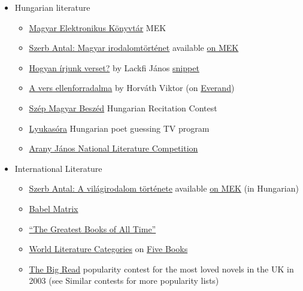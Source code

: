\documentclass{article}
\begin{document}
\begin{itemize}
    \item Hungarian literature
    \begin{itemize}
        \item \href{https://mek.oszk.hu/}{Magyar Elektronikus Könyvtár} MEK
        \item \href{https://moly.hu/konyvek/szerb-antal-magyar-irodalomtortenet}{Szerb Antal: Magyar irodalomtörténet} available \href{https://mek.oszk.hu/14800/14871/}{on MEK}
        \item \href{https://moly.hu/konyvek/lackfi-janos-hogyan-irjunk-verset}{Hogyan írjunk verset?} by Lackfi János \href{https://olvassbele.com/2021/02/05/lackfi-janos-hogyan-irjunk-verset-reszlet/}{snippet}
        \item \href{https://moly.hu/konyvek/horvath-viktor-a-vers-ellenforradalma}{A vers ellenforradalma} by Horváth Viktor (on \href{https://www.scribd.com/book/342092705/A-vers-ellenforradalma-A-versiras-es-versforditas-tanulasa-es-tanitasa}{Everand})
        \item \href{https://szepmagyarbeszed.hu/}{Szép Magyar Beszéd} Hungarian Recitation Contest
        \item \href{https://nava.hu/talalati-lista/?q=lyukas%C3%B3ra}{Lyukasóra} Hungarian poet guessing TV program
        \item \href{https://eotvos-tata.edu.hu/versenyek/AJIverseny/AJIverseny.htm}{Arany János National Literature Competition}
    \end{itemize}
    \item International Literature
    \begin{itemize}
        \item \href{https://moly.hu/konyvek/szerb-antal-a-vilagirodalom-tortenete}{Szerb Antal: A világirodalom története} available \href{https://mek.oszk.hu/14800/14872/}{on MEK} (in Hungarian)
        \item \href{https://www.babelmatrix.org/}{Babel Matrix}
        \item \href{https://thegreatestbooks.org/}{``The Greatest Books of All Time''}
        \item \href{https://fivebooks.com/category/fiction/world-literature-books/}{World Literature Categories} on \href{https://fivebooks.com/}{Five Books}
        \item \href{https://en.wikipedia.org/wiki/The_Big_Read}{The Big Read} popularity contest for the most loved novels in the UK in 2003 (see Similar contests for more popularity lists) 

\end{itemize}
\end{itemize}
\end{document}
